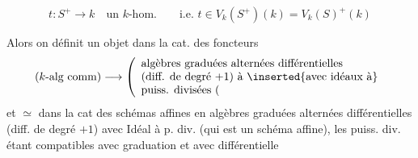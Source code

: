 \[
 t:S^+\longrightarrow k\quad\text{un $k$-hom.}\qquad
\text{i.e. }t\in V_k(S^+)(k)=V_k(S)^+(k)
\]

Alors on définit un objet  dans la cat. des foncteurs
\[
(k\text{-alg comm})\longrightarrow
\left(\begin{array}{l}\text{algèbres graduées alternées différentielles}\\
\text{(diff. de degré $+1$) à}\ \inserted{\text{avec idéaux à}}\\
\text{puiss. divisées (}\end{array}\right.
\]
et $\simeq$ dans la cat des  schémas affines  en algèbres graduées alternées différentielles (diff. de degré $+1$) avec Idéal  à p. div. (qui est un schéma affine), les puiss. div. étant compatibles avec graduation et avec différentielle

